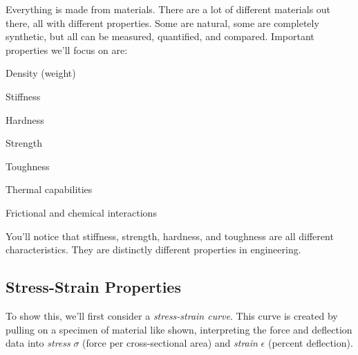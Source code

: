 \documentclass[10pt,letterpaper]{book}
\begin{document}
 Everything is made from materials. There are a lot of different materials out there, all with different properties. Some are natural, some are completely synthetic, but all can be measured, quantified, and compared. Important properties we'll focus on are:
 
 \begin{compactitem}
 	\item Density (weight)
 	\item Stiffness
 	\item Hardness
 	\item Strength
 	\item Toughness
 	\item Thermal capabilities
 	\item Frictional and chemical interactions
 \end{compactitem}
 
 You'll notice that stiffness, strength, hardness, and toughness are all different characteristics. They are distinctly different properties in engineering.
 
 \subsection{Stress-Strain Properties}
 
 To show this, we'll first consider a \textit{stress-strain curve}. This curve is created by pulling on a specimen of material like shown, interpreting the force and deflection data into \textit{stress} $\sigma$ (force per cross-sectional area) and \textit{strain} $\epsilon$ (percent deflection).
 
\end{document}
